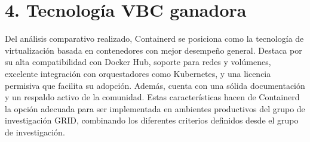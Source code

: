 \section*{4. Tecnología VBC ganadora}

Del análisis comparativo realizado, Containerd se posiciona como la tecnología de virtualización basada en contenedores con mejor desempeño general. Destaca por su alta compatibilidad con Docker Hub, soporte para redes y volúmenes, excelente integración con orquestadores como Kubernetes, y una licencia permisiva que facilita su adopción. Además, cuenta con una sólida documentación y un respaldo activo de la comunidad. Estas características hacen de Containerd la opción adecuada para ser implementada en ambientes productivos del grupo de investigación GRID, combinando los diferentes criterios definidos desde el grupo de investigación.